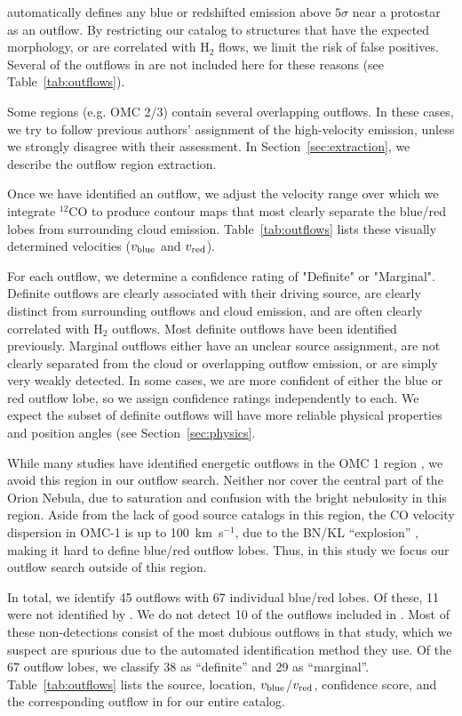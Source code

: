 \documentclass[twocolumn]{aastex63}
\newcommand{\co}[1][]{\ensuremath{^{#1}}CO}
\begin{document}
\citet{Tanabe:submitted} automatically defines any blue or redshifted emission above $5\sigma$ near a protostar as an outflow. By restricting our catalog to structures that have the expected morphology, or are correlated with H$_2$ flows, we limit the risk of false positives. Several of the outflows in \citet{Tanabe:submitted} are not included here for these reasons (see Table~\ref{tab:outflows}).

Some regions (e.g. OMC 2/3) contain several overlapping outflows. In these cases, we try to follow previous authors' assignment of the high-velocity emission, unless we strongly disagree with their assessment. In Section~\ref{sec:extraction}, we describe the outflow region extraction.

Once we have identified an outflow, we adjust the velocity range over which we integrate \co[12]{} to produce contour maps that most clearly separate the blue/red lobes from surrounding cloud emission. Table~\ref{tab:outflows} lists these visually determined velocities ($v_{\rm blue}$ and $v_{\rm red}$).

For each outflow, we determine a confidence rating of "Definite" or "Marginal". Definite outflows are clearly associated with their driving source, are clearly distinct from surrounding outflows and cloud emission, and are often clearly correlated with H$_2$ outflows. Most definite outflows have been identified previously. Marginal outflows either have an unclear source assignment, are not clearly separated from the cloud or overlapping outflow emission, or are simply very weakly detected. In some cases, we are more confident of either the blue or red outflow lobe, so we assign confidence ratings independently to each. We expect the subset of definite outflows will have more reliable physical properties and position angles (see Section~\ref{sec:physics}.

While many studies have identified energetic outflows in the OMC 1 region \citep[e.g.][]{Schmid-Burgk90,Zapata05,Teixeira16,Bally17}, we avoid this region in our outflow search. Neither \citet{Davis09} nor \citet{Furlan16} cover the central part of the Orion Nebula, due to saturation and confusion with the bright nebulosity in this region. Aside from the lack of good source catalogs in this region, the CO velocity dispersion in OMC-1 is up to 100~km~s$^{-1}$, due to the BN/KL ``explosion'' \citep{Bally17}, making it hard to define blue/red outflow lobes. Thus, in this study we focus our outflow search outside of this region. 

In total, we identify 45 outflows with 67 individual blue/red lobes. Of these, 11 were not identified by \citet{Tanabe:submitted}. We do not detect 10 of the outflows included in \citet{Tanabe:submitted}. Most of these non-detections consist of the most dubious outflows in that study, which we suspect are spurious due to the automated identification method they use. Of the 67 outflow lobes, we classify 38 as ``definite'' and 29 as ``marginal''. Table~\ref{tab:outflows} lists the source, location, $v_{\rm blue}$/$v_{\rm red}$, confidence score, and the corresponding outflow in \citet{Tanabe:submitted} for our entire catalog.
\end{document}
